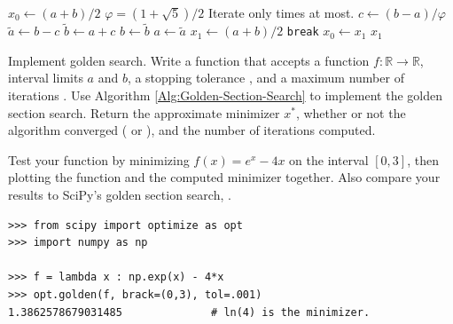 \begin{algorithm}[H]
\begin{algorithmic}[1]
   \State $x_0 \gets (a + b)/2$
   \State $\varphi = (1+\sqrt{5})/2$
        \Comment Iterate only  times at most.
        \State $c \gets (b - a)/\varphi$
        \State $\tilde{a} \gets b - c$
        \State $\tilde{b} \gets a + c$
            \State $b \gets \tilde{b}$
         \Else{}
            \State $a \gets \tilde{a}$
                \EndIf
        \State $x_1 \gets (a + b)/2$
              \State \texttt{break}
       \EndIf
        \State $x_0 \gets x_1$
   \EndFor
   \State {} $x_1$
\EndProcedure
\end{algorithmic}
\caption{The Golden Section Search}
\label{Alg:Golden-Section-Search}
\end{algorithm}

\begin{problem}{Implement golden search.}
Write a function that accepts a function $f:\mathbb{R}\rightarrow\mathbb{R}$, interval limits $a$ and $b$, a stopping tolerance , and a maximum number of iterations .
Use Algorithm \ref{Alg:Golden-Section-Search} to implement the golden section search.
Return the approximate minimizer $x^*$, whether or not the algorithm converged ( or ), and the number of iterations computed.

Test your function by minimizing $f(x) = e^x - 4x$ on the interval $[0, 3]$, then plotting the function and the computed minimizer together.
Also compare your results to SciPy's golden section search, .

\begin{lstlisting}
>>> from scipy import optimize as opt
>>> import numpy as np

>>> f = lambda x : np.exp(x) - 4*x
>>> opt.golden(f, brack=(0,3), tol=.001)
1.3862578679031485              # ln(4) is the minimizer.
\end{lstlisting}
\label{prob:golden-section-search}
\end{problem}

